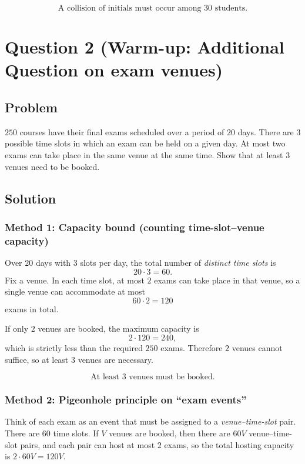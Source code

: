 \documentclass[12pt]{article}
\begin{document}
\[
\boxed{\text{A collision of initials must occur among 30 students.}}
\]

\newpage

\section{Question 2 (Warm-up: Additional Question on exam venues)}
\subsection{Problem}
$250$ courses have their final exams scheduled over a period of $20$ days. There are $3$ possible time slots in which an exam can be held on a given day. At most two exams can take place in the same venue at the same time. Show that at least $3$ venues need to be booked.

\subsection{Solution}

\subsubsection{Method 1: Capacity bound (counting time-slot--venue capacity)}
Over $20$ days with $3$ slots per day, the total number of \emph{distinct time slots} is
\[
20\cdot 3 = 60.
\]
Fix a venue. In each time slot, at most $2$ exams can take place in that venue, so a single venue can accommodate at most
\[
60\cdot 2 = 120
\]
exams in total.

If only $2$ venues are booked, the maximum capacity is
\[
2\cdot 120 = 240,
\]
which is strictly less than the required $250$ exams. Therefore $2$ venues cannot suffice, so at least $3$ venues are necessary.

\[
\boxed{\text{At least }3\text{ venues must be booked.}}
\]

\subsubsection{Method 2: Pigeonhole principle on ``exam events''}
Think of each exam as an event that must be assigned to a \emph{venue--time-slot} pair. There are $60$ time slots. If $V$ venues are booked, then there are $60V$ venue--time-slot pairs, and each pair can host at most $2$ exams, so the total hosting capacity is $2\cdot 60V=120V$.
\end{document}
